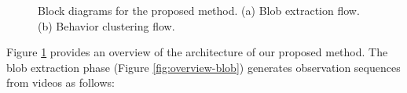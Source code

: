 \begin{figure}[t]
  \caption[Block diagrams for the proposed method.]{\small Block
    diagrams for the proposed method.  (a) Blob extraction flow. (b)
    Behavior clustering flow.}
  \label{fig:overview-blob-diagram}
\end{figure}

Figure \ref{fig:overview-blob-diagram} provides an overview of the
architecture of our proposed method.  The blob extraction phase
(Figure \ref{fig:overview-blob}) generates observation sequences from
videos as follows:

